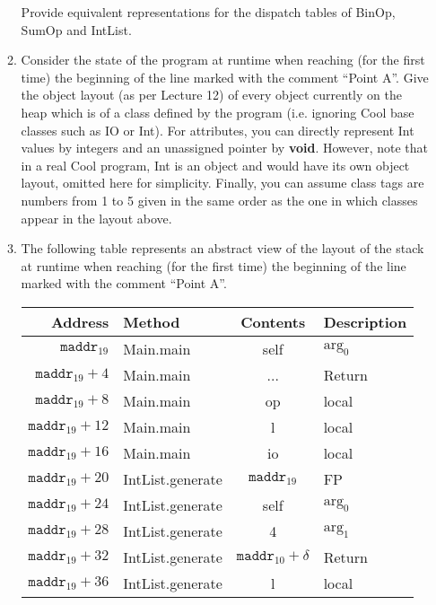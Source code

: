 \documentclass[11pt]{article}
\begin{document}
\begin{enumerate}
\begin{enumerate}
    Provide equivalent representations for the dispatch tables of BinOp, SumOp and IntList.
    \item  Consider the state of the program at runtime when reaching (for the first time) the beginning of the line marked with the comment ``Point A''. Give the object layout (as per Lecture 12) of every object currently on the heap which is of a class defined by the program (i.e. ignoring Cool base classes such as IO or Int). For attributes, you can directly represent Int values by integers and an unassigned pointer by \textbf{void}. However, note that in a real Cool program, Int is an object and would have its own object layout, omitted here for simplicity. Finally, you can assume class tags are numbers from 1 to 5 given in the same order as the one in which classes appear in the layout above.
    \item  The following table represents an abstract view of the layout of the stack at runtime when reaching (for the first time) the beginning of the line marked with the comment ``Point A''. \\
    
    \begin{tabular}{ | r | l | c | l | }
    \hline
    Address & Method & Contents & Description \\
    \hline
    $\mathtt{maddr}_{19}$ & Main.main & self & $\mbox{arg}_0$ \\
    \hline
    $\mathtt{maddr}_{19}+4$ & Main.main & ... & Return \\
    \hline
    $\mathtt{maddr}_{19}+8$ & Main.main & op & local \\
    \hline
    $\mathtt{maddr}_{19}+12$ & Main.main & l & local \\
    \hline
    $\mathtt{maddr}_{19}+16$ & Main.main & io & local \\
    \hline
    $\mathtt{maddr}_{19}+20$ & IntList.generate & $\mathtt{maddr}_{19}$ & FP \\
    \hline
    $\mathtt{maddr}_{19}+24$ & IntList.generate & self & $\mbox{arg}_0$ \\
    \hline
    $\mathtt{maddr}_{19}+28$ & IntList.generate & 4 & $\mbox{arg}_1$ \\
    \hline
    $\mathtt{maddr}_{19}+32$ & IntList.generate & $\mathtt{maddr}_{10}+\delta$ & Return \\
    \hline
    $\mathtt{maddr}_{19}+36$ & IntList.generate & l & local \\
    \hline
    \end{tabular} \\
    

\end{enumerate}
\end{enumerate}
\end{document}

